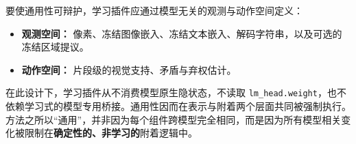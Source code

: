 要使通用性可辩护，学习插件应通过模型无关的观测与动作空间定义：
\begin{itemize}
  \item \textbf{观测空间：} 像素、冻结图像嵌入、冻结文本嵌入、解码字符串，以及可选的冻结区域提议。
  \item \textbf{动作空间：} 片段级的视觉支持、矛盾与弃权估计。
\end{itemize}

在此设计下，学习插件从不消费模型原生隐状态，不读取 \texttt{lm\_head.weight}，也不依赖学习式的模型专用桥接。通用性因而在表示与附着两个层面共同被强制执行。方法之所以``通用''，并非因为每个组件跨模型完全相同，而是因为所有模型相关变化被限制在\textbf{确定性的、非学习的}附着逻辑中。
